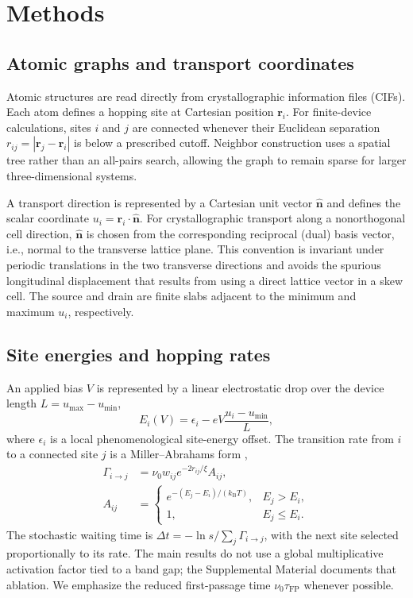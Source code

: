 \documentclass[aps,prmaterials,reprint,amsmath,amssymb,superscriptaddress,longbibliography]{revtex4-2}
\newcommand{\taufp}{\tau_{\mathrm{FP}}}
\newcommand{\kb}{k_{\mathrm B}}
\begin{document}
\section{Methods}

\subsection{Atomic graphs and transport coordinates}
Atomic structures are read directly from crystallographic information files (CIFs). Each atom defines a hopping site at Cartesian position $\mathbf r_i$. For finite-device calculations, sites $i$ and $j$ are connected whenever their Euclidean separation $r_{ij}=|\mathbf r_j-\mathbf r_i|$ is below a prescribed cutoff. Neighbor construction uses a spatial tree rather than an all-pairs search, allowing the graph to remain sparse for larger three-dimensional systems.

A transport direction is represented by a Cartesian unit vector $\hat{\mathbf n}$ and defines the scalar coordinate $u_i=\mathbf r_i\cdot\hat{\mathbf n}$. For crystallographic transport along a nonorthogonal cell direction, $\hat{\mathbf n}$ is chosen from the corresponding reciprocal (dual) basis vector, i.e., normal to the transverse lattice plane. This convention is invariant under periodic translations in the two transverse directions and avoids the spurious longitudinal displacement that results from using a direct lattice vector in a skew cell. The source and drain are finite slabs adjacent to the minimum and maximum $u_i$, respectively.

\subsection{Site energies and hopping rates}
An applied bias $V$ is represented by a linear electrostatic drop over the device length $L=u_{\max}-u_{\min}$,
\begin{equation} E_i(V)=\epsilon_i-eV\frac{u_i-u_{\min}}{L}, \end{equation}
where $\epsilon_i$ is a local phenomenological site-energy offset. The transition rate from $i$ to a connected site $j$ is a Miller--Abrahams form \cite{miller1960},
\begin{align}
\Gamma_{i\rightarrow j}&=\nu_0 w_{ij}e^{-2r_{ij}/\xi}A_{ij},\\
A_{ij}&=\begin{cases}e^{-(E_j-E_i)/(\kb T)}, & E_j>E_i,\\1, & E_j\leq E_i.\end{cases}
\end{align}
The stochastic waiting time is $\Delta t=-\ln s/\sum_j\Gamma_{i\rightarrow j}$, with the next site selected proportionally to its rate. The main results do not use a global multiplicative activation factor tied to a band gap; the Supplemental Material documents that ablation. We emphasize the reduced first-passage time $\nu_0\taufp$ whenever possible.
\end{document}
